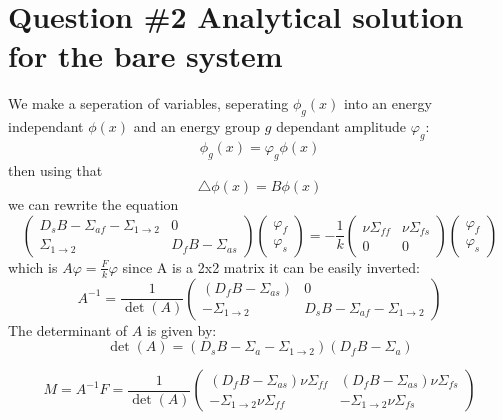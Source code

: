 \documentclass[11pt,a4paper]{article}
\begin{document}
\section{Question \#2 Analytical solution for the bare system}

We make a seperation of variables, seperating $\phi_{g}(x)$ into an energy independant $\phi(x)$ and an energy group $g$ dependant amplitude $\varphi_{g}$:
$$
\phi_{g}(x) = \varphi_{g}\phi(x)
$$
then using that
$$
\triangle \phi(x) = B\phi(x)
$$
we can rewrite the equation
$$
\begin{pmatrix}
D_{s} B - \Sigma_{af} - \Sigma_{1\to2}  & 0 \\
\Sigma_{1\to2}  & D_{f} B - \Sigma_{as}
\end{pmatrix} \begin{pmatrix}
\varphi_{f} \\
\varphi_{s}
\end{pmatrix} = -
\frac{1}{k} \begin{pmatrix}
\nu\Sigma_{ff}  & \nu\Sigma_{fs} \\
0 & 0
\end{pmatrix} \begin{pmatrix}
\varphi_{f} \\
\varphi_{s}
\end{pmatrix}
$$
which is $A\varphi = \frac{F}{k}\varphi$
since A is a 2x2 matrix it can be easily inverted:
$$
A^{-1} = \frac{1}{\det(A)} \begin{pmatrix} (D_{f} B - \Sigma_{as}) & 0 \\ -\Sigma_{1\to2} & D_{s} B - \Sigma_{af} - \Sigma_{1\to2} \end{pmatrix}
$$
The determinant of \( A \) is given by:
$$
\det(A) = (D_{s} B - \Sigma_{a} - \Sigma_{1\to2})(D_{f} B - \Sigma_{a}) 
$$

\begin{equation}
	M = A^{-1} F=\frac{1}{\operatorname{det}(A)}\left(\begin{array}{cc}
	\left(D_f B-\Sigma_{a s}\right) \nu \Sigma_{f f} & \left(D_f B-\Sigma_{a s}\right) \nu \Sigma_{f s} \\
	-\Sigma_{1 \rightarrow 2} \nu \Sigma_{f f} & -\Sigma_{1 \rightarrow 2} \nu \Sigma_{f s}
	\end{array}\right)
\end{equation}
\end{document}
